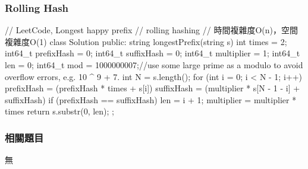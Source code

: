 \subsubsection{Rolling Hash}
\begin{Code}
// LeetCode, Longest happy prefix
// rolling hashing
// 時間複雜度O(n)，空間複雜度O(1)
class Solution {
public:
    string longestPrefix(string s) {
        int times = 2;
        int64_t prefixHash = 0;
        int64_t suffixHash = 0;
        int64_t multiplier = 1;
        int64_t len = 0;
        int64_t mod = 1000000007;//use some large prime as a modulo to avoid overflow errors, e.g. 10 ^ 9 + 7.
        int N = s.length();
        for (int i = 0; i < N - 1; i++) {
            prefixHash = (prefixHash * times + s[i]) %
            suffixHash = (multiplier * s[N - 1 - i] + suffixHash) %
            if (prefixHash == suffixHash)
                len = i + 1;
            multiplier = multiplier * times %
        }
        return s.substr(0, len);
    }
};
\end{Code}

\subsubsection{相關題目}
\begindot
\item 無
\myenddot
